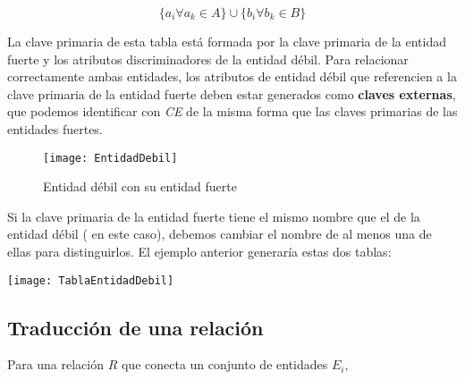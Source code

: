 \[\{a_i\forall a_k\in A\}\cup\{b_i\forall b_k\in B\}\]

La clave primaria de esta tabla está formada por la clave primaria de la entidad fuerte y los atributos discriminadores de la entidad débil.
Para relacionar correctamente ambas entidades, los atributos de entidad débil que referencien a la clave primaria de la entidad fuerte deben estar generados como \textbf{claves externas}, que podemos identificar con \textit{CE} de la misma forma que las claves primarias de las entidades fuertes.

\begin{figure}[h]
\begin{center}
	\texttt{[image: EntidadDebil]}
\end{center}
\caption{Entidad débil con su entidad fuerte}
\end{figure}

\pagebreak

Si la clave primaria de la entidad fuerte tiene el mismo nombre que el de la entidad débil ( en este caso), debemos cambiar el nombre de al menos una de ellas para distinguirlos.
El ejemplo anterior generaría estas dos tablas:

\texttt{[image: TablaEntidadDebil]}

\subsection{Traducción de una relación}

Para una relación $R$ que conecta un conjunto de entidades $E_i$,
